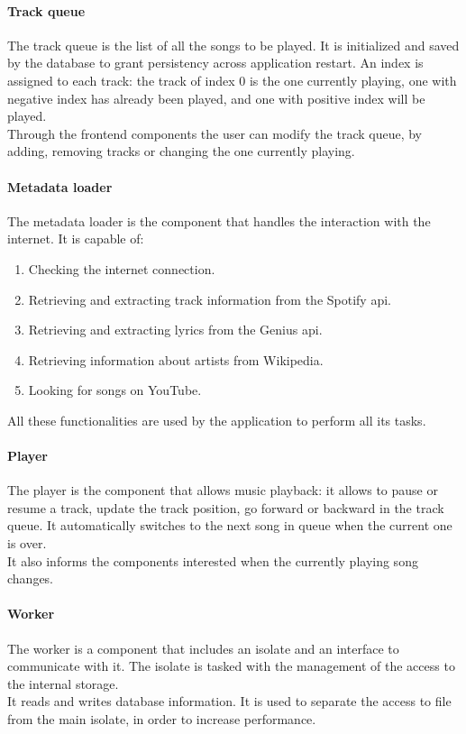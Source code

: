 \documentclass{article}
\begin{document}
\paragraph{Track queue}
The track queue is the list of all the songs to be played. It is initialized and
saved by the database to grant persistency across application restart. An index
is assigned to each track: the track of index 0 is the one currently playing,
one with negative index has already been played, and one with positive index
will be played.
\\
Through the frontend components the user can modify the track queue, by adding,
removing tracks or changing the one currently playing.

\paragraph{Metadata loader}
The metadata loader is the component that handles the interaction with the
internet. It is capable of:
\begin{enumerate}
    \item Checking the internet connection.
    \item Retrieving and extracting track information from the Spotify api.
    \item Retrieving and extracting lyrics from the Genius api.
    \item Retrieving information about artists from Wikipedia.
    \item Looking for songs on YouTube.
\end{enumerate}
All these functionalities are used by the application to perform all its tasks.

\paragraph{Player}
The player is the component that allows music playback: it allows to pause or
resume a track, update the track position, go forward or backward in the track
queue. It automatically switches to the next song in queue when the current one
is over.
\\
It also informs the components interested when the currently playing song
changes.


\paragraph{Worker}
The worker is a component that includes an isolate and an interface to
communicate with it. The isolate is tasked with the management of the access to
the internal storage.
\\
It reads and writes database information. It is used to separate the access to
file from the main isolate, in order to increase performance.
\end{document}
